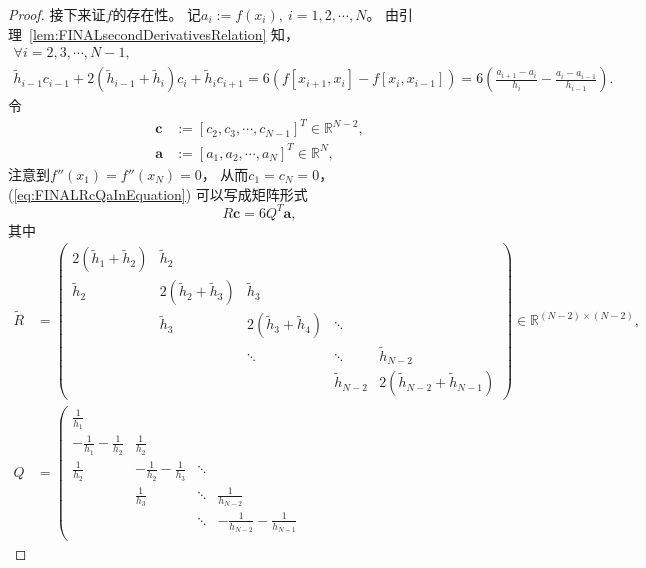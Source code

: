 \begin{proof}
  接下来证$f$的存在性。
  记$a_{i}:=f(x_{i}),\ i=1,2,\cdots,N$。
  由引理~\ref{lem:FINALsecondDerivativesRelation} 知，
  \begin{equation}
    \label{eq:FINALRcQaInEquation}
    \begin{array}{l}
       \forall i=2,3,\cdots, N-1,\\
       \tilde{h}_{i-1}c_{i-1}
      +2(\tilde{h}_{i-1}+\tilde{h}_{i})c_{i}
      +\tilde{h}_{i}c_{i+1}
    = 6(f[x_{i+1},x_{i}]-f[x_{i},x_{i-1}])
    =  6 \left( \frac{a_{i+1}-a_{i}}{h_{i}}
      -\frac{a_{i}-a_{i-1}}{h_{i-1}}\right).
    \end{array}
  \end{equation}
  令
  \begin{align*}
    \mathbf{c}
    &:=[c_{2},c_{3},\cdots,c_{N-1}]^{T}\in \mathbb{R}^{N-2},\\
    \mathbf{a}&:=[a_{1},a_{2},\cdots,a_{N}]^{T}\in \mathbb{R}^{N},
  \end{align*}
  注意到$f''(x_{1})=f''(x_{N})=0$，
  从而$c_{1}=c_{N}=0$，
  (\ref{eq:FINALRcQaInEquation}) 可以写成矩阵形式
  \begin{equation}
    \label{eq:FINALRcQaInMatrix}
    R\mathbf{c}=6Q^{T}\mathbf{a},
  \end{equation}
  其中
  \begin{align}
    \label{eq:FINALppSSFR}
       \tilde{R}&=\left(
		\begin{array}{ccccc}
			2(\tilde{h}_1+\tilde{h}_2)& \tilde{h}_2&& &\\
			\tilde{h}_2& 2(\tilde{h}_2+\tilde{h}_3)& \tilde{h}_3&&\\
			& \tilde{h}_3  &2(\tilde{h}_3+\tilde{h}_4)  &\ddots&\\
			&&\ddots&\ddots&\tilde{h}_{N-2}\\
			&&& \tilde{h}_{N-2} &2(\tilde{h}_{N-2}+\tilde{h}_{N-1})
		\end{array}
                  \right)\in \mathbb{R}^{(N-2)\times(N-2)},\\
    \label{eq:FINALppSSFQ}
     Q&=\left(
      \begin{array}{cccc}
        \frac{1}{h_1}& & &\\
        -\frac{1}{h_1}-\frac{1}{h_2}& \frac{1}{h_{2}}& &\\
        \frac{1}{h_2}& -\frac{1}{h_2}-\frac{1}{h_3}  &\ddots  &\\
                     &\frac{1}{h_{3}}&\ddots&\frac{1}{h_{N-2}}\\
                     &&\ddots&-\frac{1}{h_{N-2}}-\frac{1}{h_{N-1}}\\

\end{array}
\end{align}
\end{proof}
